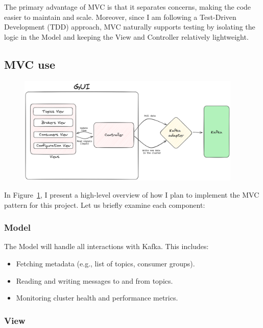 \documentclass[10pt , a4paper]{report}
\begin{document}
The primary advantage of MVC is that it separates concerns, making the code easier to maintain and scale. Moreover, since I am following a Test-Driven Development (TDD) approach, MVC naturally supports testing by isolating the logic in the Model and keeping the View and Controller relatively lightweight.

\subsection{MVC use}

\begin{figure}[htbp]
  \begin{center}
    \includegraphics[width=0.95\textwidth]{imgs/InitialArchitecture.png}
  \end{center}
  \caption{}\label{fig:mvc_diagram}
\end{figure}

In Figure~\ref{fig:mvc_diagram}, I present a high-level overview of how I plan to implement the MVC pattern for this project. Let us briefly examine each component:

\subsubsection{Model}

The Model will handle all interactions with Kafka. This includes:
\begin{itemize}
    \item Fetching metadata (e.g., list of topics, consumer groups).
    \item Reading and writing messages to and from topics.
    \item Monitoring cluster health and performance metrics.
\end{itemize}

\subsubsection{View}
\end{document}
